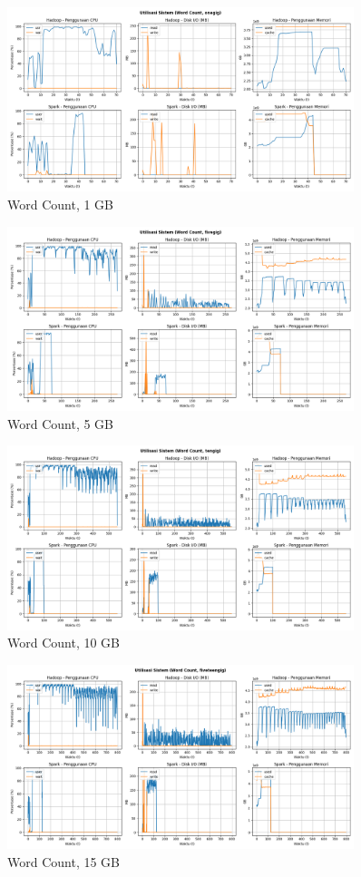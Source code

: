 \begin{figure}[h]
    \centering
    \includegraphics[width=0.9\textwidth]{figures/ch04/5-util-sistem-wordcount-onegig.png}
    \caption*{Word Count, 1 GB}
\end{figure}

\begin{figure}[h]
    \centering
    \includegraphics[width=0.9\textwidth]{figures/ch04/5-util-sistem-wordcount-fivegig.png}
    \caption*{Word Count, 5 GB}
\end{figure}

\begin{figure}[h]
    \centering
    \includegraphics[width=0.9\textwidth]{figures/ch04/5-util-sistem-wordcount-tengig.png}
    \caption*{Word Count, 10 GB}
\end{figure}

\begin{figure}[h]
    \centering
    \includegraphics[width=0.9\textwidth]{figures/ch04/5-util-sistem-wordcount-fiveteengig.png}
    \caption*{Word Count, 15 GB}
\end{figure}

